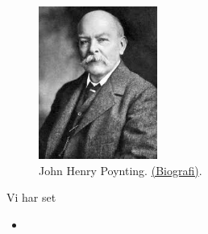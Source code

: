 \begin{figure}[h]
\centerline{\includegraphics[height=50mm]{FIGS/PERSPoynting}}
\begin{center}
\caption{\small{John Henry Poynting. \href{http://en.wikipedia.org/wiki/John_Henry_Poynting}{(Biografi)}.}} \label{figPoynting}
\end{center}
\end{figure}



\begin{summary}
Vi har set 
\begin{itemize}
\item 
\end{itemize}
\end{summary}






